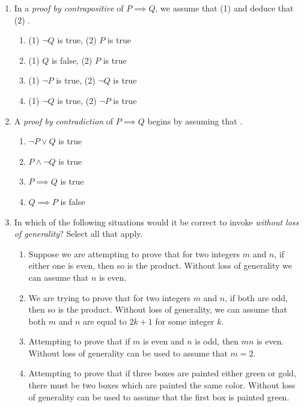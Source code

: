 \begin{enumerate}
  \item In a \emph{proof by contrapositive} of $P \implies Q$, we assume that (1) \underline{\phantom{$Q$ is false}\qquad\qquad} and deduce that (2) \underline{\phantom{$P$ is false}\qquad\qquad}.
  \begin{enumerate}
      \item (1) $\neg Q$ is true, \quad (2) $P$ is true
      \item (1) $Q$ is false, \quad (2) $P$ is true
      \item (1) $\neg P$ is true, \quad (2) $\neg Q$ is true 
      \item (1) $\neg Q$ is true, \quad (2) $\neg P$ is true
  \end{enumerate}
  
  
  \item A \emph{proof by contradiction} of $P \implies Q$ begins by assuming that \underline{\phantom{$P$ is true and $Q$ is false}\qquad\qquad}.
  \begin{enumerate}
      \item $\neg P \lor Q$ is true
      \item $P \land \neg Q$ is true
      \item $P \implies Q$ is true
      \item $Q \implies P$ is false
  \end{enumerate}

  \item In which of the following situations would it be correct to invoke \emph{without loss of generality}? Select all that apply.
  \begin{enumerate}
      \item Suppose we are attempting to prove that for two integers $m$ and $n$, if either one is even, then so is the product.
      Without loss of generality we can assume that $n$ is even.
      \item We are trying to prove that for two integers $m$ and $n$, if both are odd, then so is the product.
      Without loss of generality, we can assume that both $m$ and $n$ are equal to $2k + 1$ for some integer $k$.
      \item Attempting to prove that if $m$ is even and $n$ is odd, then $mn$ is even. Without loss of generality can be used to assume that $m = 2$.
      \item Attempting to prove that if three boxes are painted either green or gold, there must be two boxes which are painted the same color. Without loss of generality can be used to assume that the first box is painted green.
  \end{enumerate}
\end{enumerate}

